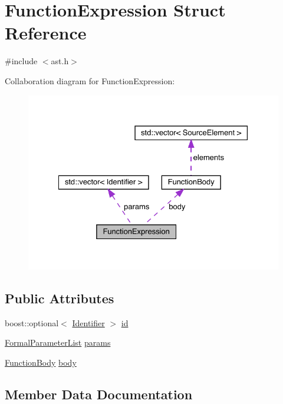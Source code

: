 \hypertarget{struct_function_expression}{}\section{Function\+Expression Struct Reference}
\label{struct_function_expression}


{\ttfamily \#include $<$ast.\+h$>$}



Collaboration diagram for Function\+Expression\+:\nopagebreak
\begin{figure}[H]
\begin{center}
\leavevmode
\includegraphics[width=328pt]{struct_function_expression__coll__graph}
\end{center}
\end{figure}
\subsection*{Public Attributes}
\begin{DoxyCompactItemize}
\item 
boost\+::optional$<$ \hyperlink{struct_identifier}{Identifier} $>$ \hyperlink{struct_function_expression_a6c7220587de4e7731ff712d6535180c2}{id}
\item 
\hyperlink{ast_8h_ad423d9c7b02512f74f787f74587e9e76}{Formal\+Parameter\+List} \hyperlink{struct_function_expression_adf1fd5d4d8c6fca0d4496dcad8430996}{params}
\item 
\hyperlink{struct_function_body}{Function\+Body} \hyperlink{struct_function_expression_a82a9fa3ab1eb96e69f11f41445e5ad5c}{body}
\end{DoxyCompactItemize}


\subsection{Member Data Documentation}
\mbox{\label{struct_function_expression_a82a9fa3ab1eb96e69f11f41445e5ad5c}} 
